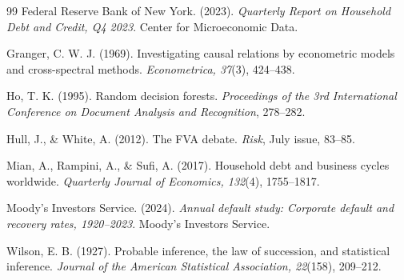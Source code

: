 \documentclass[11pt,a4paper]{article}
\begin{document}
\begin{thebibliography}{99}
Federal Reserve Bank of New York. (2023).
\textit{Quarterly Report on Household Debt and Credit, Q4 2023}.
Center for Microeconomic Data.

Granger, C. W. J. (1969).
Investigating causal relations by econometric models and cross-spectral methods.
\textit{Econometrica, 37}(3), 424--438.

Ho, T. K. (1995).
Random decision forests.
\textit{Proceedings of the 3rd International Conference on Document Analysis and Recognition}, 278--282.

Hull, J., \& White, A. (2012).
The FVA debate.
\textit{Risk}, July issue, 83--85.

Mian, A., Rampini, A., \& Sufi, A. (2017).
Household debt and business cycles worldwide.
\textit{Quarterly Journal of Economics, 132}(4), 1755--1817.

Moody's Investors Service. (2024).
\textit{Annual default study: Corporate default and recovery rates, 1920--2023}.
Moody's Investors Service.

Wilson, E. B. (1927).
Probable inference, the law of succession, and statistical inference.
\textit{Journal of the American Statistical Association, 22}(158), 209--212.

\end{thebibliography}
\end{document}
